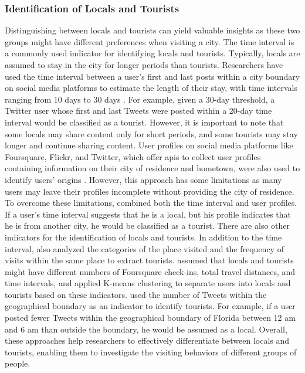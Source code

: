 \documentclass{article}
\theoremstyle{remark}
\begin{document}
\subsubsection{Identification of Locals and Tourists}
Distinguishing between locals and tourists can yield valuable insights as these two groups might have different preferences when visiting a city. The time interval is a commonly used indicator for identifying locals and tourists. Typically, locals are assumed to stay in the city for longer periods than tourists. Researchers have used the time interval between a user's first and last posts within a city boundary on social media platforms to estimate the length of their stay, with time intervals ranging from 10 days to 30 days \citep{girardin_digital_2008, hu_graph-based_2019, hopken_flickr_2020}. For example, given a 30-day threshold, a Twitter user whose first and last Tweets were posted within a 20-day time interval would be classified as a tourist. However, it is important to note that some locals may share content only for short periods, and some tourists may stay longer and continue sharing content. User profiles on social media platforms like Foursquare, Flickr, and Twitter, which offer \acrshort{api}s to collect user profiles containing information on their city of residence and hometown, were also used to identify users' origins \citep{ferreira_beyond_2015, li_analyzing_2018}. However, this approach has some limitations as many users may leave their profiles incomplete without providing the city of residence. To overcome these limitations, \cite{ferreira_uncovering_2020} combined both the time interval and user profiles. If a user's time interval suggests that he is a local, but his profile indicates that he is from another city, he would be classified as a tourist. There are also other indicators for the identification of locals and tourists. In addition to the time interval, \cite{hallot_who_2015} also analyzed the categories of the place visited and the frequency of visits within the same place to extract tourists. \cite{yang_identifying_2021} assumed that locals and tourists might have different numbers of Foursquare check-ins, total travel distances, and time intervals, and applied K-means clustering to separate users into locals and tourists based on these indicators. \cite{hasnat_identifying_2018} used the number of Tweets within the geographical boundary as an indicator to identify tourists. For example, if a user posted fewer Tweets within the geographical boundary of Florida between 12 am and 6 am than outside the boundary, he would be assumed as a local. Overall, these approaches help researchers to effectively differentiate between locals and tourists, enabling them to investigate the visiting behaviors of different groups of people.
\end{document}
